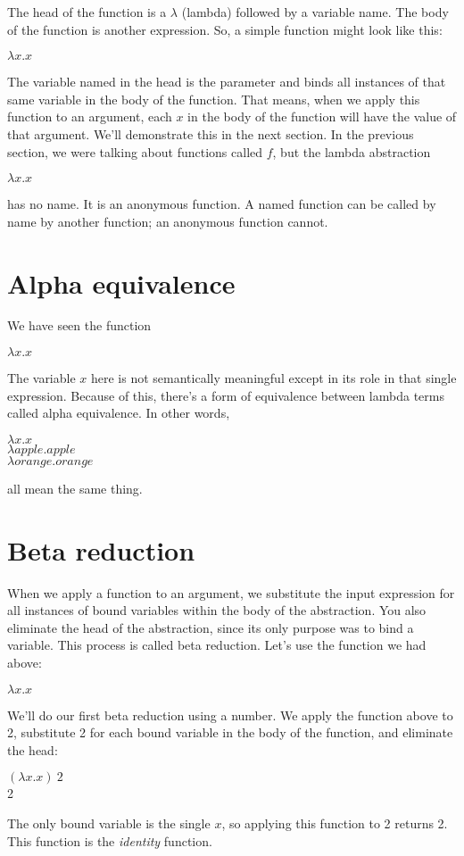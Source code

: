 \documentclass[11pt]{article}
\begin{document}
The head of the function is a $\lambda$ (lambda) followed by a variable name. The body of the function is another expression. So, a simple function might look like this:
\begin{center}
$\lambda x.x$
\end{center}
The variable named in the head is the parameter and binds all instances of that same variable in the body of the function. That means, when we apply this function to an argument, each $x$ in the body of the function will have the value of that argument. We’ll demonstrate this in the next section.
In the previous section, we were talking about functions called $f$, but the lambda abstraction \begin{center}
$\lambda x.x$
\end{center}
has no name. It is an anonymous function. A named function can be called by name by another function; an anonymous function cannot.

\section{Alpha equivalence}
We have seen the function
\begin{center}
$\lambda x.x$
\end{center}
The variable $x$ here is not semantically meaningful except in its role in that single expression. Because of this, there’s a form of equivalence between lambda terms called alpha equivalence. In other words, 
\begin{center}
$\lambda x.x$ \\
$\lambda apple.apple$\\
$\lambda orange.orange$\\
\end{center}
all mean the same thing. 
\section{Beta reduction}
When we apply a function to an argument, we substitute the input expression for all instances of bound variables within the body of the abstraction. You also eliminate the head of the abstraction, since its only purpose was to bind a variable. This process is called beta reduction.
Let’s use the function we had above:
\begin{center}
$\lambda x.x$
\end{center}
We’ll do our first beta reduction using a number. We apply the function above to 2, substitute 2 for each bound variable in the body of the function, and eliminate the head:
\begin{center}
$(\lambda x.x) \ 2  $ \\
\hspace*{.5in}2
\end{center}
The only bound variable is the single $x$, so applying this function to 2 returns 2. This function is the \textit{identity} function.
\end{document}
